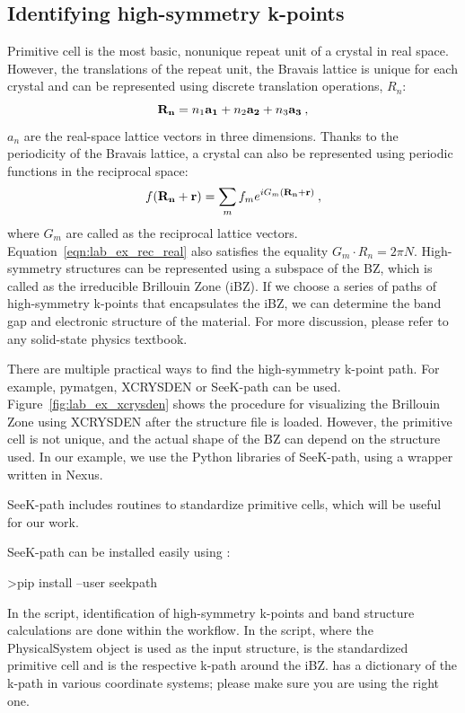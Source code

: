 \subsection{Identifying high-symmetry k-points}\label{sec:lab_ex_highk}
Primitive cell is the most basic, nonunique repeat unit of a crystal in real space. 
However, the translations of the repeat unit, the Bravais lattice is unique for each crystal and can be represented using discrete translation operations, $R_n$:
\begin{equation}
{\bf R_n} = n_1{\bf a_1} + n_2{\bf a_2} + n_3{\bf a_3}\:,
\end{equation}
$a_n$ are the real-space lattice vectors in three dimensions. Thanks to the periodicity of the Bravais lattice, a crystal can also be represented using periodic functions in the reciprocal space:
\begin{equation}
f({\bf R_n + r})= \sum_{m}f_me^{iG_m({\bf R_n+r})}\label{eqn:lab_ex_rec_real}\:,
\end{equation}
where $G_m$ are called as the reciprocal lattice vectors. Equation~\ref{eqn:lab_ex_rec_real} also satisfies the equality $G_m\cdot{R_n}=2{\pi}N$. High-symmetry structures can be represented using a subspace of the BZ, which is called as the irreducible Brillouin Zone (iBZ). If we choose a series of  paths of high-symmetry k-points that encapsulates the iBZ, we can determine the band gap and electronic structure of the material. For more discussion, please refer to any solid-state physics textbook. 

There are multiple practical ways to find the high-symmetry k-point path. 
For example, pymatgen, \cite{Ong2013} XCRYSDEN \cite{Kokalj1999} or SeeK-path \cite{Hinuma2017} can be used. 
Figure~\ref{fig:lab_ex_xcrysden} shows the procedure for visualizing the Brillouin Zone using XCRYSDEN after the structure file is loaded. 
However, the primitive cell is not unique, and the actual shape of the BZ can depend on the structure used. 
In our example, we use the Python libraries of SeeK-path, using a wrapper written in Nexus. 

SeeK-path includes routines to standardize primitive cells, which will be useful for our work.

SeeK-path can be installed easily using :
\begin{shade}
>pip install --user seekpath
\end{shade}
 
In the  script, identification of high-symmetry k-points and band structure calculations are done within the workflow. 
In the script, where the  PhysicalSystem object is used as the input structure,  is the standardized primitive cell and  is the respective k-path around the iBZ. 
 has a dictionary of the k-path in various coordinate systems; please make sure you are using the right one. 

